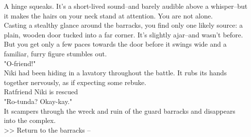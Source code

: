 A hinge squeaks. It's a short-lived sound--and barely audible above a whisper--but it makes the hairs on your neck stand at attention. You are not alone.\\

Casting a stealthy glance around the barracks, you find only one likely source: a plain, wooden door tucked into a far corner. It's slightly ajar--and wasn't before.\\

But you get only a few paces towards the door before it swings wide and a familiar, furry figure stumbles out.\\

"O-friend!"\\

Niki had been hiding in a lavatory throughout the battle. It rubs its hands together nervously, as if expecting some rebuke.\\
 Ratfriend Niki is rescued\\

"Ro-tunda? Okay-kay."\\

It scampers through the wreck and ruin of the guard barracks and disappears into the complex.\\

>> Return to the barracks -- 